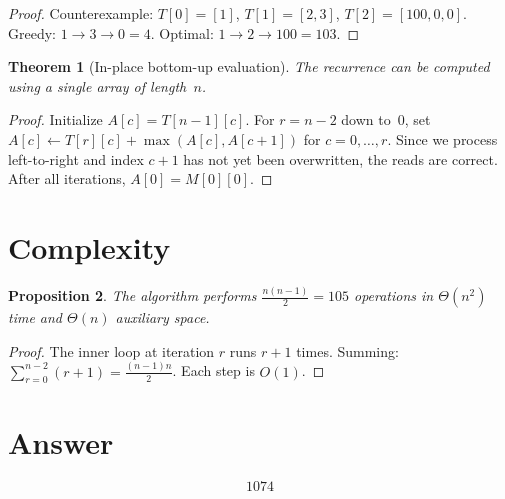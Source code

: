 \documentclass[12pt,a4paper]{article}
\newtheorem{theorem}{Theorem}
\newtheorem{proposition}[theorem]{Proposition}
\theoremstyle{definition}
\begin{document}
\begin{proof}
Counterexample: $T[0]=[1]$, $T[1]=[2,3]$, $T[2]=[100,0,0]$.
Greedy: $1 \to 3 \to 0 = 4$. Optimal: $1 \to 2 \to 100 = 103$.
\end{proof}

\begin{theorem}[In-place bottom-up evaluation]
The recurrence can be computed using a single array of length~$n$.
\end{theorem}

\begin{proof}
Initialize $A[c] = T[n{-}1][c]$. For $r = n{-}2$ down to~$0$, set
$A[c] \gets T[r][c] + \max(A[c], A[c{+}1])$ for $c = 0, \ldots, r$. Since we process
left-to-right and index $c{+}1$ has not yet been overwritten, the reads are correct.
After all iterations, $A[0] = M[0][0]$.
\end{proof}

\section{Complexity}

\begin{proposition}
The algorithm performs $\frac{n(n-1)}{2} = 105$ operations in $\Theta(n^2)$ time
and $\Theta(n)$ auxiliary space.
\end{proposition}

\begin{proof}
The inner loop at iteration $r$ runs $r + 1$ times. Summing:
$\sum_{r=0}^{n-2}(r+1) = \frac{(n-1)n}{2}$. Each step is $O(1)$.
\end{proof}

\section{Answer}

\[
\boxed{1074}
\]
\end{document}
